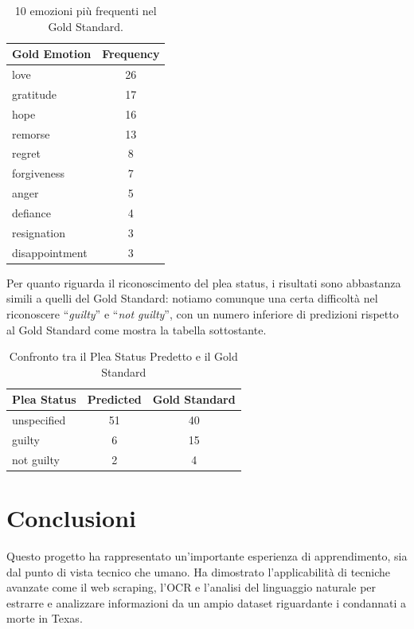 \documentclass[11pt]{article}
\begin{document}
\begin{table}[H]
\centering
\begin{tabular}{|l|c|}
\hline
\textbf{Gold Emotion} & \textbf{Frequency} \\ \hline
love              & 26 \\ \hline
gratitude         & 17 \\ \hline
hope              & 16 \\ \hline
remorse           & 13 \\ \hline
regret             & 8 \\ \hline
forgiveness        & 7 \\ \hline
anger              & 5 \\ \hline
defiance           & 4 \\ \hline
resignation        & 3 \\ \hline
disappointment     & 3 \\ \hline
\end{tabular}
\caption{10 emozioni più frequenti nel Gold Standard.}
\label{tab:gold_emotions}
\end{table}

Per quanto riguarda il riconoscimento del plea status, i risultati sono abbastanza simili a quelli del Gold Standard: notiamo comunque una certa difficoltà nel riconoscere “\textit{guilty}” e “\textit{not guilty}”, con un numero inferiore di predizioni rispetto al Gold Standard come mostra la tabella sottostante. 
\begin{table}[h!]
\centering
\begin{tabular}{|l|c|c|}
\hline
\textbf{Plea Status} & \textbf{Predicted} & \textbf{Gold Standard} \\ \hline
unspecified          & 51                 & 40                     \\ \hline
guilty               & 6                  & 15                     \\ \hline
not guilty           & 2                  & 4                      \\ \hline
\end{tabular}
\caption{Confronto tra il Plea Status Predetto e il Gold Standard}
\label{tab:plea_status}
\end{table}

\section{Conclusioni}
Questo progetto ha rappresentato un’importante esperienza di apprendimento, sia dal punto di vista tecnico che umano. Ha dimostrato l’applicabilità di tecniche avanzate come il web scraping, l’OCR e l’analisi del linguaggio naturale per estrarre e analizzare informazioni da un ampio dataset riguardante i condannati a morte in Texas. 
\end{document}
